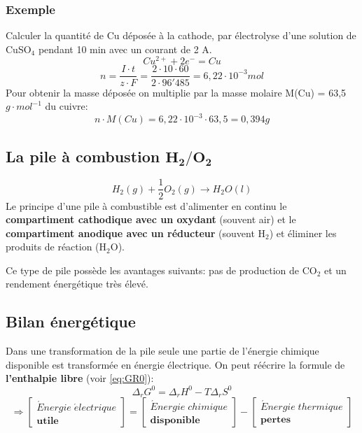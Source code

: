\documentclass[10pt,a4paper]{book}
\begin{document}
\subsubsection{Exemple}
Calculer la quantité de Cu déposée à la cathode, par électrolyse d'une solution de CuSO$_4$ pendant 10 min avec un courant de 2 A.
\[Cu^{2+} + 2e^- = Cu\]
\[n = \frac{I\cdot t}{z\cdot F} = \frac{2 \cdot 10 \cdot 60}{2 \cdot 96'485} = 6,22\cdot 10^{-3}mol\]
Pour obtenir la masse déposée on multiplie par la masse molaire M(Cu) = 63,5$g\cdot mol^{-1}$ du cuivre:
\[n\cdot M(Cu) = 6,22 \cdot 10^{-3} \cdot 63,5 = 0,394g\]

\subsection{La pile à combustion \texorpdfstring{$\mathbf{H_2/O_2}$}{H2/O2}}
\[H_2(g) + \frac{1}{2}O_2(g)\longrightarrow H_2O (l)\]
Le principe d’une pile à combustible est d’alimenter en continu le \textbf{compartiment cathodique avec un oxydant} (souvent air) et le \textbf{compartiment anodique avec un réducteur} (souvent H$_2$) et éliminer les produits de réaction (H$_2$O). \par
Ce type de pile possède les avantages suivants: pas de production de CO$_2$ et un rendement énergétique très élevé.

\subsection{Bilan énergétique}

Dans une transformation de la pile seule une partie de l'énergie chimique disponible est transformée en énergie électrique. On peut réécrire la formule de \textbf{l'enthalpie libre} (voir \ref{eq:GR0}):
\[\Delta_rG^0 = \Delta_rH^0 - T\Delta_rS^0\]
\[\Rightarrow \left[ \begin{array}{c} \acute{E}nergie \; \acute{e}lectrique \\ \mathbf{utile} \end{array} \right]
=
\left[ \begin{array}{c} \acute{E}nergie \; chimique \\ \mathbf{disponible} \end{array} \right]
-
\left[ \begin{array}{c} \acute{E}nergie \; thermique \\ \mathbf{pertes} \end{array} \right]
\]
\end{document}
